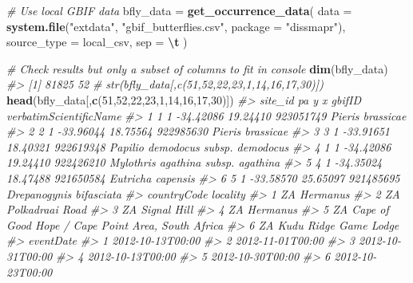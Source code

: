 \documentclass[
]{article}
\newenvironment{Shaded}{\begin{snugshade}}{\end{snugshade}}
\newcommand{\AttributeTok}[1]{\textcolor[rgb]{0.13,0.29,0.53}{#1}}
\newcommand{\CommentTok}[1]{\textcolor[rgb]{0.56,0.35,0.01}{\textit{#1}}}
\newcommand{\DecValTok}[1]{\textcolor[rgb]{0.00,0.00,0.81}{#1}}
\newcommand{\FunctionTok}[1]{\textcolor[rgb]{0.13,0.29,0.53}{\textbf{#1}}}
\newcommand{\NormalTok}[1]{#1}
\newcommand{\OtherTok}[1]{\textcolor[rgb]{0.56,0.35,0.01}{#1}}
\newcommand{\SpecialCharTok}[1]{\textcolor[rgb]{0.81,0.36,0.00}{\textbf{#1}}}
\newcommand{\StringTok}[1]{\textcolor[rgb]{0.31,0.60,0.02}{#1}}
\begin{document}
\begin{Shaded}
\begin{Highlighting}[]
\CommentTok{\# Use local GBIF data}
\NormalTok{bfly\_data }\OtherTok{=} \FunctionTok{get\_occurrence\_data}\NormalTok{(}
  \AttributeTok{data =} \FunctionTok{system.file}\NormalTok{(}\StringTok{"extdata"}\NormalTok{, }\StringTok{"gbif\_butterflies.csv"}\NormalTok{, }\AttributeTok{package =} \StringTok{"dissmapr"}\NormalTok{),}
  \AttributeTok{source\_type =} \StringTok{\textquotesingle{}local\_csv\textquotesingle{}}\NormalTok{,}
  \AttributeTok{sep =} \StringTok{\textquotesingle{}}\SpecialCharTok{\textbackslash{}t}\StringTok{\textquotesingle{}}
\NormalTok{)}

\CommentTok{\# Check results but only a subset of columns to fit in console}
\FunctionTok{dim}\NormalTok{(bfly\_data)}
\CommentTok{\#\textgreater{} [1] 81825    52}
\CommentTok{\# str(bfly\_data[,c(51,52,22,23,1,14,16,17,30)]) }
\FunctionTok{head}\NormalTok{(bfly\_data[,}\FunctionTok{c}\NormalTok{(}\DecValTok{51}\NormalTok{,}\DecValTok{52}\NormalTok{,}\DecValTok{22}\NormalTok{,}\DecValTok{23}\NormalTok{,}\DecValTok{1}\NormalTok{,}\DecValTok{14}\NormalTok{,}\DecValTok{16}\NormalTok{,}\DecValTok{17}\NormalTok{,}\DecValTok{30}\NormalTok{)])}
\CommentTok{\#\textgreater{}   site\_id pa         y        x    gbifID             verbatimScientificName}
\CommentTok{\#\textgreater{} 1       1  1 {-}34.42086 19.24410 923051749                   Pieris brassicae}
\CommentTok{\#\textgreater{} 2       2  1 {-}33.96044 18.75564 922985630                   Pieris brassicae}
\CommentTok{\#\textgreater{} 3       3  1 {-}33.91651 18.40321 922619348 Papilio demodocus subsp. demodocus}
\CommentTok{\#\textgreater{} 4       1  1 {-}34.42086 19.24410 922426210 Mylothris agathina subsp. agathina}
\CommentTok{\#\textgreater{} 5       4  1 {-}34.35024 18.47488 921650584                  Eutricha capensis}
\CommentTok{\#\textgreater{} 6       5  1 {-}33.58570 25.65097 921485695            Drepanogynis bifasciata}
\CommentTok{\#\textgreater{}   countryCode                                          locality}
\CommentTok{\#\textgreater{} 1          ZA                                          Hermanus}
\CommentTok{\#\textgreater{} 2          ZA                                   Polkadraai Road}
\CommentTok{\#\textgreater{} 3          ZA                                       Signal Hill}
\CommentTok{\#\textgreater{} 4          ZA                                          Hermanus}
\CommentTok{\#\textgreater{} 5          ZA Cape of Good Hope / Cape Point Area, South Africa}
\CommentTok{\#\textgreater{} 6          ZA                             Kudu Ridge Game Lodge}
\CommentTok{\#\textgreater{}          eventDate}
\CommentTok{\#\textgreater{} 1 2012{-}10{-}13T00:00}
\CommentTok{\#\textgreater{} 2 2012{-}11{-}01T00:00}
\CommentTok{\#\textgreater{} 3 2012{-}10{-}31T00:00}
\CommentTok{\#\textgreater{} 4 2012{-}10{-}13T00:00}
\CommentTok{\#\textgreater{} 5 2012{-}10{-}30T00:00}
\CommentTok{\#\textgreater{} 6 2012{-}10{-}23T00:00}


\end{Highlighting}
\end{Shaded}
\end{document}
